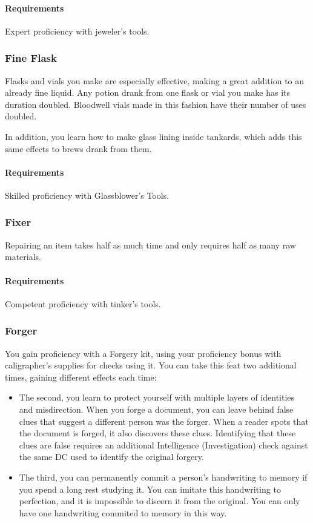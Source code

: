     \paragraph{Requirements} Expert proficiency with jeweler's tools.
\subsubsection{Fine Flask} \label{feat::fineflask}
    Flasks and vials you make are especially effective, making a great addition to an already fine liquid.
    Any potion drank from one flask or vial you make has its duration doubled.
    Bloodwell vials made in this fashion have their number of uses doubled.

    In addition, you learn how to make glass lining inside tankards, which adds this same effects to brews drank from them.
    \paragraph{Requirements} Skilled proficiency with Glassblower's Tools.
\subsubsection{Fixer} \label{feat::fixer}
    Repairing an item takes half as much time and only requires half as many raw materials.
    \paragraph{Requirements} Competent proficiency with tinker's tools.
\subsubsection{Forger} \label{feat::forger}
    You gain proficiency with a Forgery kit, using your proficiency bonus with caligrapher's supplies for checks using it.
    You can take this feat two additional times, gaining different effects each time:
    \begin{itemize}
        \item The second, you learn to protect yourself with multiple layers of identities and misdirection.
        When you forge a document, you can leave behind false clues that suggest a different person was the forger.
        When a reader spots that the document is forged, it also discovers these clues.
        Identifying that these clues are false requires an additional Intelligence (Investigation) check against the same DC used to identify the original forgery.
        \item The third, you can permanently commit a person's handwriting to memory if you spend a long rest studying it.
        You can imitate this handwriting to perfection, and it is impossible to discern it from the original.
        You can only have one handwriting commited to memory in this way.
    \end{itemize}
